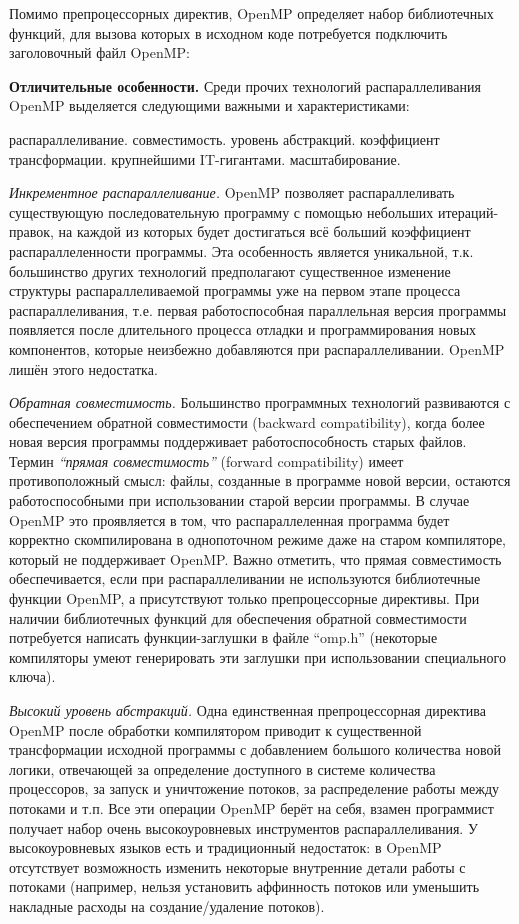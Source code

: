 Помимо препроцессорных директив, OpenMP определяет набор библиотечных функций, для вызова которых в исходном коде потребуется подключить заголовочный файл OpenMP:

\textbf{Отличительные особенности.} Среди прочих технологий распараллеливания OpenMP выделяется следующими важными и характеристиками:

\begin{itemize}
     распараллеливание.
     совместимость.
     уровень абстракций.
     коэффициент трансформации.
     крупнейшими IT-гигантами. 
     масштабирование.
\end{itemize}

\textit{Инкрементное распараллеливание.}  OpenMP позволяет распараллеливать существующую последовательную программу с помощью небольших итераций-правок, на каждой из которых будет достигаться всё больший коэффициент распараллеленности программы. Эта особенность является уникальной, т.к. большинство других технологий предполагают существенное изменение структуры распараллеливаемой программы уже на первом этапе процесса распараллеливания, т.е. первая работоспособная параллельная версия программы появляется после длительного процесса отладки и программирования новых компонентов, которые неизбежно добавляются при распараллеливании. OpenMP лишён этого недостатка.

\textit{Обратная совместимость.} Большинство программных технологий развиваются с обеспечением обратной совместимости (back\-ward com\-pat\-i\-bil\-i\-ty), когда более новая версия программы поддерживает работоспособность старых файлов. Термин \textit{``прямая совместимость''} (forward compatibility) имеет противоположный смысл: файлы, созданные в программе новой версии, остаются работоспособными при использовании старой версии программы. В случае OpenMP это проявляется в том, что распараллеленная программа будет корректно скомпилирована в однопоточном режиме даже на старом компиляторе, который не поддерживает OpenMP. Важно отметить, что прямая совместимость обеспечивается, если при распараллеливании не используются библиотечные функции OpenMP, а присутствуют только препроцессорные директивы. При наличии библиотечных функций для обеспечения обратной совместимости потребуется написать функции-заглушки в файле ``omp.h'' (некоторые компиляторы умеют генерировать эти заглушки при использовании специального ключа).

\textit{Высокий уровень абстракций.} Одна единственная препроцессорная директива OpenMP после обработки компилятором приводит к существенной трансформации исходной программы с добавлением большого количества новой логики, отвечающей за определение доступного в системе количества процессоров, за запуск и уничтожение потоков, за распределение работы между потоками и т.п. Все эти операции OpenMP берёт на себя, взамен программист получает набор очень высокоуровневых инструментов распараллеливания. У высокоуровневых языков есть и традиционный недостаток: в OpenMP отсутствует возможность изменить некоторые внутренние детали работы с потоками (например, нельзя установить аффинность потоков или уменьшить накладные расходы на создание/удаление потоков).

